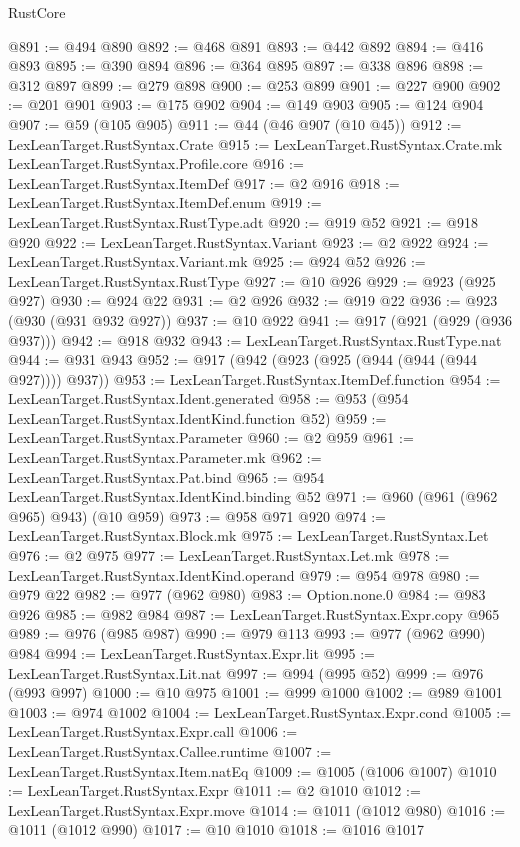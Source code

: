 \begin{lexlean}{RustCore}
\begin{coremodule}
@891 := @494 @890
@892 := @468 @891
@893 := @442 @892
@894 := @416 @893
@895 := @390 @894
@896 := @364 @895
@897 := @338 @896
@898 := @312 @897
@899 := @279 @898
@900 := @253 @899
@901 := @227 @900
@902 := @201 @901
@903 := @175 @902
@904 := @149 @903
@905 := @124 @904
@907 := @59 (@105 @905)
@911 := @44 (@46 @907 (@10 @45))
@912 := LexLeanTarget.RustSyntax.Crate
@915 := LexLeanTarget.RustSyntax.Crate.mk LexLeanTarget.RustSyntax.Profile.core
@916 := LexLeanTarget.RustSyntax.ItemDef
@917 := @2 @916
@918 := LexLeanTarget.RustSyntax.ItemDef.enum
@919 := LexLeanTarget.RustSyntax.RustType.adt
@920 := @919 @52
@921 := @918 @920
@922 := LexLeanTarget.RustSyntax.Variant
@923 := @2 @922
@924 := LexLeanTarget.RustSyntax.Variant.mk
@925 := @924 @52
@926 := LexLeanTarget.RustSyntax.RustType
@927 := @10 @926
@929 := @923 (@925 @927)
@930 := @924 @22
@931 := @2 @926
@932 := @919 @22
@936 := @923 (@930 (@931 @932 @927))
@937 := @10 @922
@941 := @917 (@921 (@929 (@936 @937)))
@942 := @918 @932
@943 := LexLeanTarget.RustSyntax.RustType.nat
@944 := @931 @943
@952 := @917 (@942 (@923 (@925 (@944 (@944 (@944 @927)))) @937))
@953 := LexLeanTarget.RustSyntax.ItemDef.function
@954 := LexLeanTarget.RustSyntax.Ident.generated
@958 := @953 (@954 LexLeanTarget.RustSyntax.IdentKind.function @52)
@959 := LexLeanTarget.RustSyntax.Parameter
@960 := @2 @959
@961 := LexLeanTarget.RustSyntax.Parameter.mk
@962 := LexLeanTarget.RustSyntax.Pat.bind
@965 := @954 LexLeanTarget.RustSyntax.IdentKind.binding @52
@971 := @960 (@961 (@962 @965) @943) (@10 @959)
@973 := @958 @971 @920
@974 := LexLeanTarget.RustSyntax.Block.mk
@975 := LexLeanTarget.RustSyntax.Let
@976 := @2 @975
@977 := LexLeanTarget.RustSyntax.Let.mk
@978 := LexLeanTarget.RustSyntax.IdentKind.operand
@979 := @954 @978
@980 := @979 @22
@982 := @977 (@962 @980)
@983 := Option.none.{0}
@984 := @983 @926
@985 := @982 @984
@987 := LexLeanTarget.RustSyntax.Expr.copy @965
@989 := @976 (@985 @987)
@990 := @979 @113
@993 := @977 (@962 @990) @984
@994 := LexLeanTarget.RustSyntax.Expr.lit
@995 := LexLeanTarget.RustSyntax.Lit.nat
@997 := @994 (@995 @52)
@999 := @976 (@993 @997)
@1000 := @10 @975
@1001 := @999 @1000
@1002 := @989 @1001
@1003 := @974 @1002
@1004 := LexLeanTarget.RustSyntax.Expr.cond
@1005 := LexLeanTarget.RustSyntax.Expr.call
@1006 := LexLeanTarget.RustSyntax.Callee.runtime
@1007 := LexLeanTarget.RustSyntax.Item.natEq
@1009 := @1005 (@1006 @1007)
@1010 := LexLeanTarget.RustSyntax.Expr
@1011 := @2 @1010
@1012 := LexLeanTarget.RustSyntax.Expr.move
@1014 := @1011 (@1012 @980)
@1016 := @1011 (@1012 @990)
@1017 := @10 @1010
@1018 := @1016 @1017

\end{coremodule}
\end{lexlean}
